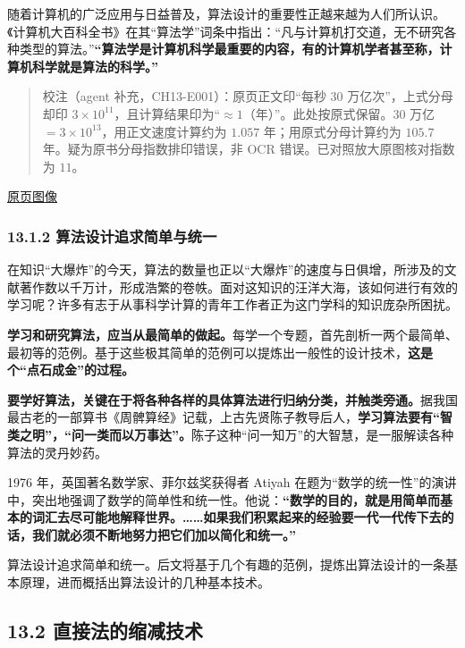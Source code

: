 \documentclass[
  10pt,
  fontset=fandol]{ctexart}
\begin{document}
随着计算机的广泛应用与日益普及，算法设计的重要性正越来越为人们所认识。《计算机大百科全书》在其``算法学''词条中指出：``凡与计算机打交道，无不研究各种类型的算法。''\textbf{``算法学是计算机科学最重要的内容，有的计算机学者甚至称，计算机科学就是算法的科学。''}

\begin{quote}
校注（agent 补充，CH13-E001）：原页正文印``每秒 30 万亿次''，上式分母却印 \(3\times10^{11}\)，且计算结果印为``\(\approx1\)（年）''。此处按原式保留。\(30\) 万亿 \(=3\times10^{13}\)，用正文速度计算约为 \(1.057\) 年；用原式分母计算约为 \(105.7\) 年。疑为原书分母指数排印错误，非 OCR 错误。已对照放大原图核对指数为 \(11\)。
\end{quote}

\href{../../source-images/pdf-308.jpeg}{原页图像}

\subsubsection{13.1.2 算法设计追求简单与统一}\label{ux7b97ux6cd5ux8bbeux8ba1ux8ffdux6c42ux7b80ux5355ux4e0eux7edfux4e00}

在知识``大爆炸''的今天，算法的数量也正以``大爆炸''的速度与日俱增，所涉及的文献著作数以千万计，形成浩繁的卷帙。面对这知识的汪洋大海，该如何进行有效的学习呢？许多有志于从事科学计算的青年工作者正为这门学科的知识庞杂所困扰。

\textbf{学习和研究算法，应当从最简单的做起。}每学一个专题，首先剖析一两个最简单、最初等的范例。基于这些极其简单的范例可以提炼出一般性的设计技术，\textbf{这是个``点石成金''的过程。}

\textbf{要学好算法，关键在于将各种各样的具体算法进行归纳分类，并触类旁通。}据我国最古老的一部算书《周髀算经》记载，上古先贤陈子教导后人，\textbf{学习算法要有``智类之明''，``问一类而以万事达''。}陈子这种``问一知万''的大智慧，是一服解读各种算法的灵丹妙药。

1976 年，英国著名数学家、菲尔兹奖获得者 Atiyah 在题为``数学的统一性''的演讲中，突出地强调了数学的简单性和统一性。他说：\textbf{``数学的目的，就是用简单而基本的词汇去尽可能地解释世界。\ldots\ldots 如果我们积累起来的经验要一代一代传下去的话，我们就必须不断地努力把它们加以简化和统一。''}

算法设计追求简单和统一。后文将基于几个有趣的范例，提炼出算法设计的一条基本原理，进而概括出算法设计的几种基本技术。

\subsection{13.2 直接法的缩减技术}\label{ux76f4ux63a5ux6cd5ux7684ux7f29ux51cfux6280ux672f}
\end{document}
